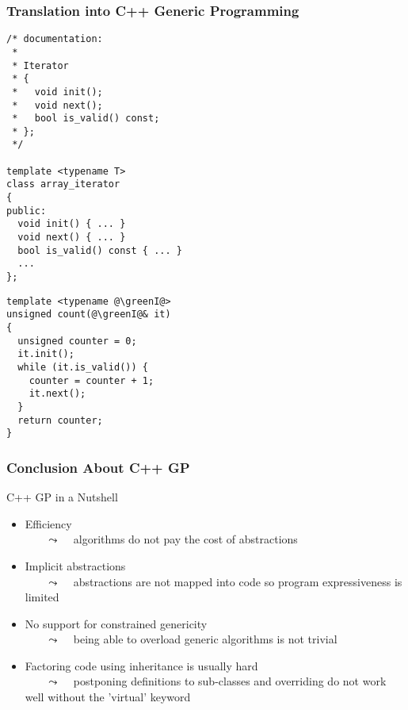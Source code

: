 \begin{frame}[fragile]
  \frametitle{Translation into C++ Generic Programming}

\begin{multicols}{2}
%
\begin{lstlisting}[escapechar=@]
/* documentation:
 * 
 * Iterator
 * {
 *   void init();
 *   void next();
 *   bool is_valid() const;
 * };
 */

template <typename T>
class array_iterator
{
public:
  void init() { ... }
  void next() { ... }
  bool is_valid() const { ... }
  ...
};
\end{lstlisting}
%
\columnbreak
%
\begin{lstlisting}[escapechar=@]
template <typename @\greenI@>
unsigned count(@\greenI@& it)
{
  unsigned counter = 0;
  it.init();
  while (it.is_valid()) {
    counter = counter + 1;
    it.next();
  }
  return counter;
}
\end{lstlisting}
%
\end{multicols}

\end{frame}



\begin{frame}
  \frametitle{Conclusion About C++ GP}

\begin{block}{C++ GP in a Nutshell}
  \begin{itemize}
  \item[\bplus]  Efficiency \\
    ~~~ {\tiny{$\leadsto$ ~ algorithms do not pay the cost of abstractions}}
  \item[\bminus] Implicit abstractions \\
    ~~~ {\tiny{$\leadsto$ ~ abstractions are not mapped into code so program expressiveness is limited}}
  \item[\bminus] No support for constrained genericity \\
    ~~~ {\tiny{$\leadsto$ ~ being able to overload generic algorithms is not trivial}}
  \item[\bminus] Factoring code using inheritance is usually hard \\
    ~~~ {\tiny{$\leadsto$ ~ postponing definitions to sub-classes and
        overriding do not work well without the 'virtual'
        keyword}}
  \end{itemize}
\end{block}

\end{frame}




